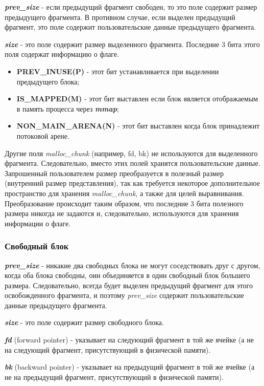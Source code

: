 \textit{\textbf{prev\_size}} - если предыдущий фрагмент свободен, то это поле содержит размер предыдущего фрагмента. В противном случае, если выделен предыдущий фрагмент, это поле содержит пользовательские данные предыдущего фрагмента.

\textit{\textbf{size}} - это поле содержит размер выделенного фрагмента. Последние 3 бита этого поля содержат информацию о флаге.
\begin{itemize}
	\item \textbf{PREV\_INUSE(P)} - этот бит устанавливается при выделении предыдущего блока;
	\item \textbf{IS\_MAPPED(M)} - этот бит выставлен если блок является отображаемым в память процесса через \textbf{\textit{mmap}};
	\item \textbf{NON\_MAIN\_ARENA(N)} - этот бит выставлен когда блок принадлежит потоковой арене.
\end{itemize}
Другие поля \textit{malloc\_chunk} (например, fd, bk) не используются для выделенного фрагмента. Следовательно, вместо этих полей хранятся пользовательские данные. Запрошенный пользователем размер преобразуется в полезный размер (внутренний размер представления), так как требуется некоторое дополнительное пространство для хранения \textit{malloc\_chunk}, а также для целей выравнивания. Преобразование происходит таким образом, что последние 3 бита полезного размера никогда не задаются и, следовательно, используются для хранения информации о флаге.

\subsubsection{Свободный блок}

\textit{\textbf{prev\_size}} - никакие два свободных блока не могут соседствовать друг с другом, когда оба блока свободны, оин объединяется в один свободный блок большего размера. Следовательно, всегда будет выделен предыдущий фрагмент для этого освобожденного фрагмента, и поэтому \textit{prev\_size} содержит пользовательские данные предыдущего фрагмента.

\textit{\textbf{size}} - это поле содержит размер свободного блока.

\textit{\textbf{fd}} (forward pointer) - указывает на следующий фрагмент в той же ячейке (а не на следующий фрагмент, присутствующий в физической памяти).

\textit{\textbf{bk}} (backward pointer) - указывает на предыдущий фрагмент в той же ячейке (а не на предыдущий фрагмент, присутствующий в физической памяти).

